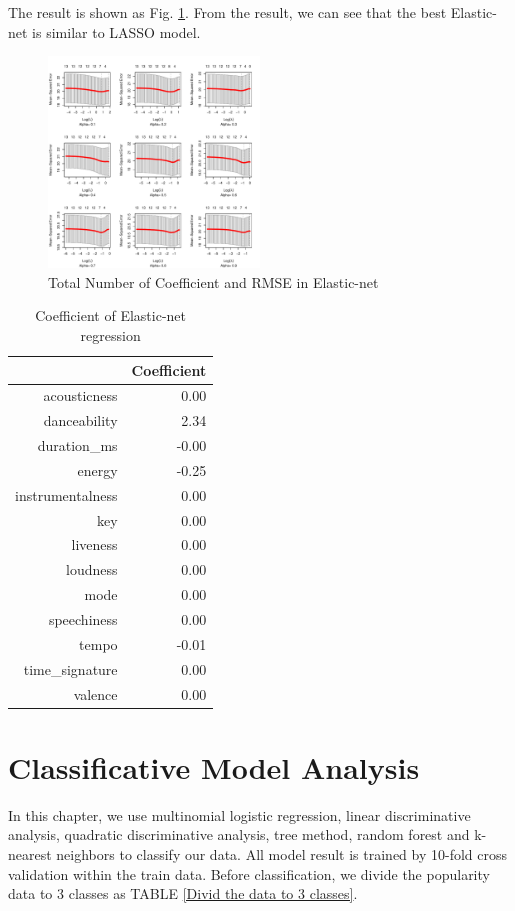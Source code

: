 \documentclass[conference]{IEEEtran}
\begin{document}
The result is shown as Fig. \ref{Total Number of Coefficient and RMSE in Elastic-net}. From the result, we can see that the best Elastic-net is similar to LASSO model.

\begin{figure}[htbp]
\centerline{\includegraphics[width=0.5\textwidth]{figure/cvfitpla_net.pdf}}
\caption{Total Number of Coefficient and RMSE in Elastic-net}
\label{Total Number of Coefficient and RMSE in Elastic-net}
\end{figure}

\begin{table}[ht]
\centering
\caption{Coefficient of Elastic-net regression}
\begin{tabular}{rr}
  \hline
 & Coefficient \\ 
  \hline
acousticness & 0.00 \\ 
  danceability & 2.34 \\ 
  duration\_ms & -0.00 \\ 
  energy & -0.25 \\ 
  instrumentalness & 0.00 \\ 
  key & 0.00 \\ 
  liveness & 0.00 \\ 
  loudness & 0.00 \\ 
  mode & 0.00 \\ 
  speechiness & 0.00 \\ 
  tempo & -0.01 \\ 
  time\_signature & 0.00 \\ 
  valence & 0.00 \\ 
   \hline
\end{tabular}
\label{Coefficient of Elastic-net regression}		
\end{table}





\section{Classificative Model Analysis}
In this chapter, we use multinomial logistic regression, linear discriminative analysis, quadratic discriminative analysis, tree method, random forest and k-nearest neighbors\cite{james2013introduction} to classify our data. All model result is trained by 10-fold cross validation within the train data. Before classification, we divide the popularity data to 3 classes as TABLE \ref{Divid the data to 3 classes}.
\end{document}
